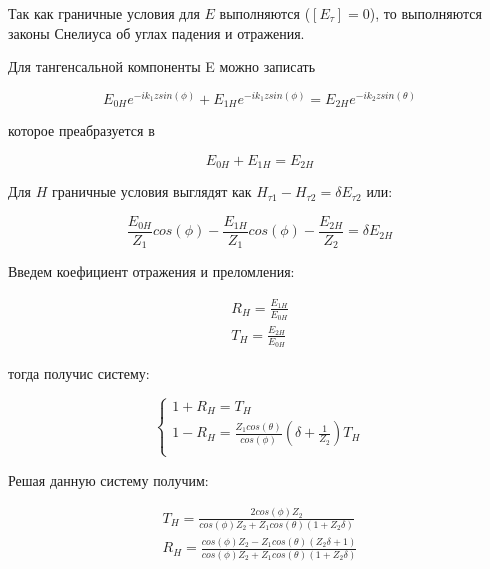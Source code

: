 	Так как граничные условия для $E$ выполняются ($[E_\tau] = 0$), то выполняются законы Снелиуса об углах падения и отражения.
	
	Для тангенсальной компоненты E можно записать 
	
	\begin{equation}
		E_{0H}e^{-ik_1zsin(\phi)} + E_{1H}e^{-ik_1zsin(\phi)} = E_{2H}e^{-ik_2zsin(\theta)}
	\end{equation}
	
	которое преабразуется в 
	
	\begin{equation*}
		\tag{79.1}
		E_{0H} + E_{1H} = E_{2H} 
	\end{equation*}
	
	Для $H$ граничные условия выглядят как $H_{\tau1} - H_{\tau2} = \delta E_{\tau2}$ или:
	
	\begin{equation}
		\frac{E_{0H}}{Z_1}cos(\phi) - \frac{E_{1H}}{Z_1}cos(\phi) - \frac{E_{2H}}{Z_2} = \delta E_{2H}
	\end{equation}
	
	Введем коефициент отражения и преломления:
	
	\begin{equation}
		\begin{aligned}
			R_H = \frac{E_{1H}}{E_{0H}} \\
			T_H = \frac{E_{2H}}{E_{0H}}
		\end{aligned}
	\end{equation}
	
	тогда получис систему:

	\begin{equation}
		\begin{cases}
			1 + R_H = T_H \\
			1 - R_H = \frac{Z_1 cos(\theta)}{cos(\phi)} (\delta + \frac{1}{Z_2})T_H \\
		\end{cases}
	\end{equation}
	
	Решая данную систему получим:
	
	\begin{equation}
		\begin{aligned}
			T_H = \frac{2 cos(\phi) Z_2}{cos(\phi)Z_2 + Z_1 cos(\theta) (1 + Z_2 \delta)} \\
			R_H = \frac{cos(\phi)Z_2 - Z_1cos(\theta)(Z_2 \delta+ 1)}{cos(\phi) Z_2 + Z_1 cos(\theta) (1 + Z_2 \delta)} 
		\end{aligned}
	\end{equation}
	
